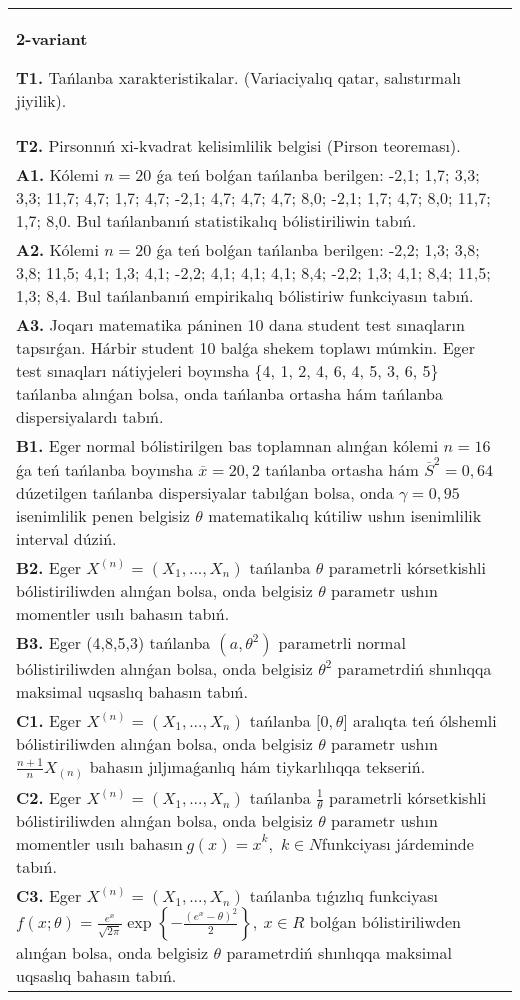 \documentclass{article}
\begin{document}
\begin{tabular}{m{17cm}}
\textbf{2-variant}
\newline

\textbf{T1.} 
Tańlanba xarakteristikalar. (Variaciyalıq qatar, salıstırmalı jiyilik).
 \\
\textbf{T2.} 
Pirsonnıń xi-kvadrat kelisimlilik belgisi (Pirson teoreması).
 \\
\textbf{A1.} 
Kólemi \(n = 20\) ǵa teń bolǵan tańlanba berilgen: -2,1; 1,7; 3,3; 3,3; 11,7; 4,7; 1,7; 4,7; -2,1; 4,7; 4,7; 4,7; 8,0; -2,1; 1,7; 4,7; 8,0; 11,7; 1,7; 8,0. Bul tańlanbanıń statistikalıq bólistiriliwin tabıń.
 \\
\textbf{A2.} 
Kólemi \(n = 20\) ǵa teń bolǵan tańlanba berilgen: -2,2; 1,3; 3,8; 3,8; 11,5; 4,1; 1,3; 4,1; -2,2; 4,1; 4,1; 4,1; 8,4; -2,2; 1,3; 4,1; 8,4; 11,5; 1,3; 8,4. Bul tańlanbanıń empirikalıq bólistiriw funkciyasın tabıń.
 \\
\textbf{A3.} 
Joqarı matematika páninen 10 dana student test sınaqların tapsırǵan. Hárbir student 10 balǵa shekem toplawı múmkin. Eger test sınaqları nátiyjeleri boyınsha \{4, 1, 2, 4, 6, 4, 5, 3, 6, 5\} tańlanba alınǵan bolsa, onda tańlanba ortasha hám tańlanba dispersiyalardı tabıń.
 \\
\textbf{B1.} 
Eger normal bólistirilgen bas toplamnan alınǵan kólemi \(n = 16\) ǵa teń tańlanba boyınsha \(\overline{x} = 20,2\) tańlanba ortasha hám \({\overline{S}}^{2} = 0,64\) dúzetilgen tańlanba dispersiyalar tabılǵan bolsa, onda \(\gamma = 0,95\) isenimlilik penen belgisiz \(\theta\) matematikalıq kútiliw ushın isenimlilik interval dúziń.
 \\
\textbf{B2.} 
Eger \(X^{(n)} = \left( X_{1},...,X_{n} \right)\) tańlanba \(\theta\) parametrli kórsetkishli bólistiriliwden alınǵan bolsa, onda belgisiz \(\theta\) parametr ushın momentler usılı bahasın tabıń.
 \\
\textbf{B3.} 
Eger (4,8,5,3) tańlanba \(\left( a,\theta^{2} \right)\) parametrli normal bólistiriliwden alınǵan bolsa, onda belgisiz \(\theta^{2}\) parametrdiń shınlıqqa maksimal uqsaslıq bahasın tabıń.
 \\
\textbf{C1.} 
Eger \(X^{(n)} = \left( X_{1},...,X_{n} \right)\) tańlanba \(\lbrack 0,\theta\rbrack\) aralıqta teń ólshemli bólistiriliwden alınǵan bolsa, onda belgisiz \(\theta\) parametr ushın \(\frac{n + 1}{n}X_{(n)}\) bahasın jıljımaǵanlıq hám tiykarlılıqqa tekseriń.
 \\
\textbf{C2.} 
Eger \(X^{(n)} = \left( X_{1},...,X_{n} \right)\) tańlanba \(\frac{1}{\theta}\) parametrli kórsetkishli bólistiriliwden alınǵan bolsa, onda belgisiz \(\theta\) parametr ushın momentler usılı bahasın\({\ g(x) = x}^{k},\) \(k \in N\)funkciyası járdeminde tabıń.
 \\
\textbf{C3.} 
Eger \(X^{(n)} = \left( X_{1},...,X_{n} \right)\) tańlanba tıǵızlıq funkciyası
$f(x;\theta) = \frac{e^{x}}{\sqrt{2\pi}}\exp\left\{ - \frac{\left( e^{x} - \theta \right)^{2}}{2} \right\},\ x \in R$
bolǵan bólistiriliwden alınǵan bolsa, onda belgisiz \(\theta\) parametrdiń shınlıqqa maksimal uqsaslıq bahasın tabıń.
 \\

\end{tabular}
\vspace{1cm}
\end{document}
